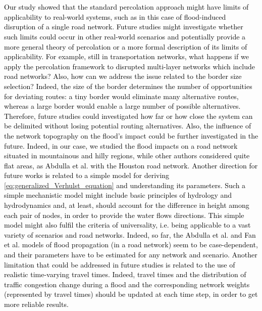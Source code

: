 \documentclass[twocolumn,fleqn,10pt]{wlscirep}
\begin{document}
\\
\\
\textcolor{black}{
Our study  showed that the standard percolation approach might have limits of applicability to real-world systems, such as in this case of flood-induced disruption of a single road network. Future studies might investigate whether such limits could occur in other real-world scenarios and potentially provide a more general theory of percolation or a more formal description of its limits of applicability. For example, still in transportation networks, what happens if we apply the percolation framework to disrupted multi-layer networks \cite{Kivela2014, Bianconi2018} which include road networks? Also, how can we address the issue related to the border size selection? Indeed, the size of the border determines the number of opportunities for deviating routes: a tiny border would eliminate many alternative routes, whereas a large border would enable a large number of possible alternatives. Therefore, future studies could investigated how far or how close the system can be delimited without losing potential routing alternatives. Also, the influence of the network topography on the flood’s impact could be further investigated in the future. Indeed, in our case, we studied the flood impacts on a road network situated in mountainous and hilly regions, while other authors considered quite flat areas, as 
Abdulla et al. \cite{Abdulla2019_conference_paper, Abdulla2020_conference_paper, Abdulla2020_SIS, Abdulla2021} with the Houston road network. Another direction for future works is related to a simple model for deriving \cref{eq:generalized_Verhulst_equation} and understanding its parameters. Such a simple mechanistic model might include basic principles of hydrology and hydrodynamics and, at least, should account for the difference in height among each pair of nodes, in order to provide the water flows directions. This simple model might also fulfil the criteria of universality, i.e. being applicable to a vast variety of scenarios and road networks. Indeed, so far, the 
Abdulla et al. \cite{Abdulla2020_SIS} and Fan et al. \cite{Fan2020} models of flood propagation (in a road network) seem to be case-dependent, and their parameters have to be estimated for any network and scenario. Another limitation that could be addressed in future studies is related to the use of realistic time-varying travel times. Indeed, travel times and the distribution of traffic congestion change during a flood and the corresponding network weights (represented by travel times) should be updated at each time step, in order to get more reliable results.}
\end{document}
